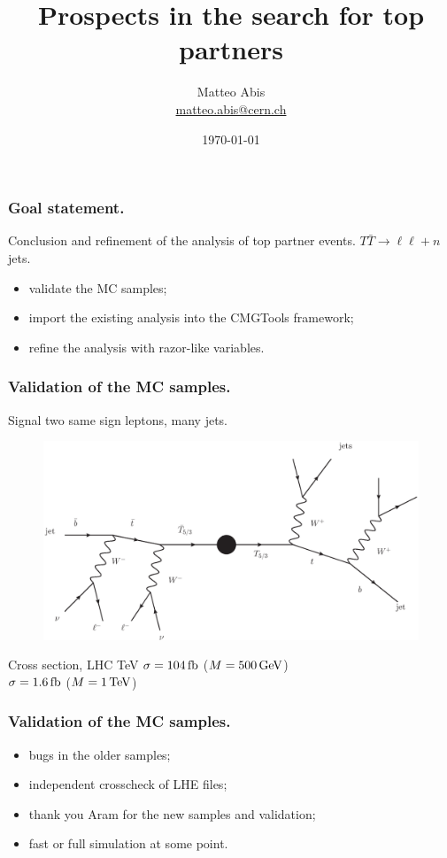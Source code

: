 \documentclass[ukenglish]{beamer}
\title{Prospects in the search for top partners}
\author{Matteo Abis\\
\url{matteo.abis@cern.ch}}
\institute{Università di Padova}
\date{\today}
\begin{document}
\begin{frame}
  \titlepage
\end{frame}
 
\begin{frame}
    \frametitle{Goal statement.}
    Conclusion and refinement of the analysis of top partner events.
    $T \bar T \longrightarrow \ell \ell + n$ jets.
    \begin{itemize}
        \item validate the MC samples;
        \item import the existing analysis into the CMGTools framework;
        \item refine the analysis with razor-like variables.
    \end{itemize}
\end{frame}

\begin{frame}
    \frametitle{Validation of the MC samples.}
    \begin{block}
        {Signal}
        two same sign leptons, many jets.
    \end{block}
    \begin{figure}[h]
        \begin{center}
            \includegraphics[width=.6\textwidth]{production.eps}
        \end{center}
    \end{figure}
    \begin{block}
        {Cross section, LHC \unit[14]{TeV}}
    $\sigma = \unit[104]{fb}$ ($M = \unit[500]{GeV}$)\\
    $\sigma = \unit[1.6]{fb}$ ($M = \unit[1]{TeV}$)
    \end{block}
\end{frame}

\begin{frame}
    \frametitle{Validation of the MC samples.}
\begin{itemize}
    \item bugs in the older samples;
    \item independent crosscheck of LHE files;
    \item thank you Aram for the new samples and validation;
    \item fast or full simulation at some point.
\end{itemize}
\end{frame}
\end{document}
